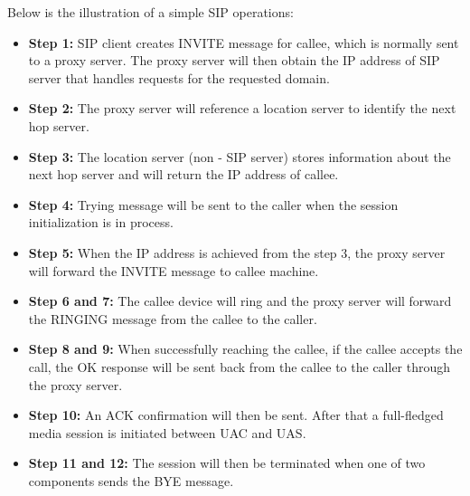     \noindent Below is the illustration of a simple SIP operations:
    \begin{itemize}
        \item \textbf {Step 1:} SIP client creates INVITE message for callee, which is normally sent to a proxy server. The proxy server will then obtain the IP address of SIP server that handles requests for the requested domain. 
        \item \textbf {Step 2:} The proxy server will reference a location server to identify the next hop server. 
        \item \textbf {Step 3:} The location server (non - SIP server) stores information about the next hop server and will return the IP address of callee.
        \item \textbf {Step 4:} Trying message will be sent to the caller when the session initialization is in process.
        \item \textbf {Step 5:} When the IP address is achieved from the step 3, the proxy server will forward the INVITE message to callee machine.
        \item \textbf {Step 6 and 7:} The callee device will ring and the proxy server will forward the RINGING message from the callee to the caller.
        \item \textbf {Step 8 and 9:} When successfully reaching the callee, if the callee accepts the call, the OK response will be sent back from the callee to the caller through the proxy server.
        \item \textbf {Step 10:} An ACK confirmation will then be sent. After that a full-fledged media session is initiated between UAC and UAS. 
        \item \textbf {Step 11 and 12:} The session will then be terminated when one of two components sends the BYE message. 
    \end{itemize}

